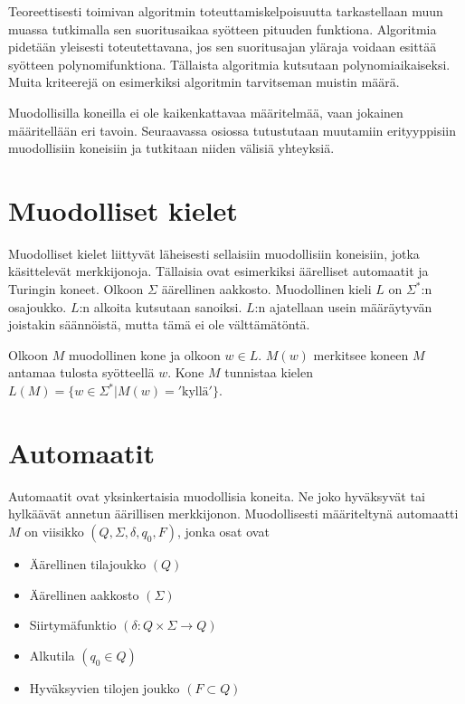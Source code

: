 \documentclass[a4paper, 12pt]{article}
\begin{document}
Teoreettisesti toimivan algoritmin toteuttamiskelpoisuutta tarkastellaan muun muassa tutkimalla sen suoritusaikaa syötteen pituuden funktiona. Algoritmia pidetään yleisesti toteutettavana, jos sen suoritusajan yläraja voidaan esittää syötteen polynomifunktiona. Tällaista algoritmia kutsutaan polynomiaikaiseksi. Muita kriteerejä on esimerkiksi algoritmin tarvitseman muistin määrä.

Muodollisilla koneilla ei ole kaikenkattavaa määritelmää, vaan jokainen määritellään eri tavoin. Seuraavassa osiossa tutustutaan muutamiin erityyppisiin muodollisiin koneisiin ja  tutkitaan niiden välisiä yhteyksiä.

\section{Muodolliset kielet}

Muodolliset kielet liittyvät läheisesti sellaisiin muodollisiin koneisiin, jotka käsittelevät merkkijonoja. Tällaisia ovat esimerkiksi äärelliset automaatit ja Turingin koneet. Olkoon $\Sigma$ äärellinen aakkosto. Muodollinen kieli $L$ on $\Sigma^*$:n osajoukko. $L$:n alkoita kutsutaan sanoiksi. $L$:n ajatellaan usein määräytyvän joistakin säännöistä, mutta tämä ei ole välttämätöntä.

Olkoon $M$ muodollinen kone ja olkoon $w \in L$. $M(w)$ merkitsee koneen $M$ antamaa tulosta syötteellä $w$. Kone $M$ tunnistaa kielen $L(M) = \{w \in \Sigma^* | M(w) = '\text{kyllä}'\}$.


\section{Automaatit}
Automaatit ovat yksinkertaisia muodollisia koneita. Ne joko hyväksyvät tai hylkäävät annetun äärillisen merkkijonon. Muodollisesti määriteltynä automaatti $M$ on viisikko $(Q, \Sigma, \delta, q_0, F)$, jonka osat ovat
\begin{itemize}
\item Äärellinen tilajoukko $(Q)$

\item Äärellinen aakkosto $(\Sigma)$

\item Siirtymäfunktio $(\delta : Q \times \Sigma \rightarrow Q)$

\item Alkutila $(q_0 \in Q)$

\item Hyväksyvien tilojen joukko $(F \subset Q)$

\end{itemize}
\end{document}
